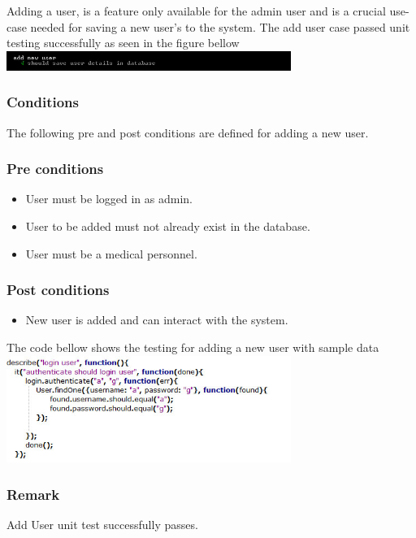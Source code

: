 
Adding a user, is a feature only available for the admin user and is a crucial use-case needed for saving a new user’s to the system.
\newline
\newline
The add user case passed unit testing successfully as seen in the figure bellow
\newline
\newline
\includegraphics[width=350px]{./Graphics/addUser}
\newline		
\subsubsection*{Conditions}
The following pre and post conditions are defined for adding a new user.
\newline
\newline	
\subsubsection*{Pre conditions}	
\begin{itemize}
		\item User must be logged in as admin.
		\item User to be added must not already exist in the database.
		\item User must be a medical personnel.
\end{itemize}	

\subsubsection*{Post conditions}	
\begin{itemize}
		\item New user is added and can interact with the system.
\end{itemize}	

The code bellow shows the testing for adding a new user with sample data	
\newline
\newline
\includegraphics[width=350px]{./Graphics/UserMustLogIn}

\subsubsection*{Remark}
Add User unit test successfully passes.